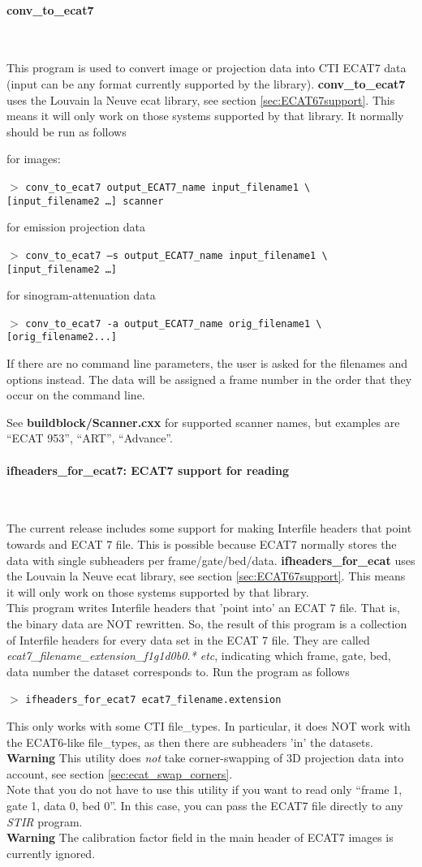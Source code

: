 \documentclass{article}
\newcommand{\tab}{\hspace{5mm}}
\newcommand{\subsubsubsection}[1]{\paragraph{#1}\mbox{} \\}
\newcommand{\cmdline}[1]{\par \noindent $>$ \texttt{#1}\par}
\begin{document}
{{{{ \subsubsubsection{conv\_to\_ecat7}
}
This program is used to convert image or projection data into 
CTI ECAT7 data (input can be any format currently supported by 
the library). \textbf{conv\_to\_ecat7} uses the Louvain la Neuve ecat 
library, see section \ref{sec:ECAT67support}. This means it will only work on those 
systems supported by that library. It normally should be run 
as follows


for images:
\cmdline{conv\_to\_ecat7 output\_ECAT7\_name input\_filename1 {\textbackslash}\\
{[}input\_filename2 \dots ] scanner}


for emission projection data
\cmdline{conv\_to\_ecat7 --s output\_ECAT7\_name input\_filename1 {\textbackslash}\\
{[}input\_filename2 \dots ]\tab  }


for sinogram-attenuation data
\cmdline{conv\_to\_ecat7 -a output\_ECAT7\_name orig\_filename1 {\textbackslash}\\
{[}orig\_filename2...]}


If there are no command line parameters, the user is asked for 
the filenames and options instead. The data will be assigned 
a frame number in the order that they occur on the command line.


See \textbf{buildblock/Scanner.cxx} for supported scanner names, but 
examples are ``ECAT 953'', ``ART'', ``Advance''. 


{ \subsubsubsection{ifheaders\_for\_ecat7: ECAT7 support for reading}
}
The current release includes some support for making Interfile 
headers that point towards and ECAT 7 file. This is possible 
because ECAT7 normally stores the data with single subheaders 
per frame/gate/bed/data. \textbf{ifheaders\_for\_ecat} uses the Louvain 
la Neuve ecat library, see section \ref{sec:ECAT67support}. 
This means it will only work on those systems 
supported by that library. \\
This program writes Interfile headers that 'point into' an ECAT 
7 file. That is, the binary data are NOT rewritten. So, the result 
of this program is a collection of Interfile headers for every 
data set in the ECAT 7 file. They are called \textit{ecat7\_filename\_extension\_f1g1d0b0.* 
etc}, indicating which frame, gate, bed, data number the dataset 
corresponds to. Run the program as follows
\cmdline{ifheaders\_for\_ecat7 ecat7\_filename.extension}


This only works with some CTI file\_types. In particular, it 
does NOT work with the ECAT6-like file\_types, as then there 
are subheaders 'in' the datasets.\\
\textbf{Warning} This utility does \textit{not} take corner-swapping of 
3D projection data into account, see section \ref{sec:ecat_swap_corners}.\\
Note that you do not have to use this utility if you want to 
read only ``frame 1, gate 1, data 0, bed 0''. In this case, you 
can pass the ECAT7 file directly to any \textit{STIR} program.
\\
\textbf{Warning} The calibration factor field in the main header of ECAT7 images
is currently ignored.

}}}
\end{document}

